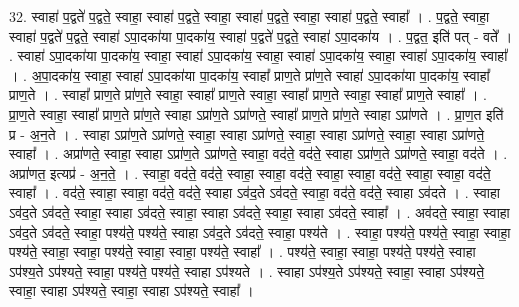 \documentclass[17pt]{extarticle}
\begin{document}
32. स्वाहा॑ प॒द्वते॑ प॒द्वते॒ स्वाहा॒ स्वाहा॑ प॒द्वते॒ स्वाहा॒ स्वाहा॑ प॒द्वते॒ स्वाहा॒ स्वाहा॑ प॒द्वते॒ स्वाहा᳚ । . प॒द्वते॒ स्वाहा॒ स्वाहा॑ प॒द्वते॑ प॒द्वते॒ स्वाहा॑ ऽपा॒दका॑या पा॒दका॑य॒ स्वाहा॑ प॒द्वते॑ प॒द्वते॒ स्वाहा॑ ऽपा॒दका॑य । . प॒द्वत॒ इति॑ पत् - वते᳚ । . स्वाहा॑ ऽपा॒दका॑या पा॒दका॑य॒ स्वाहा॒ स्वाहा॑ ऽपा॒दका॑य॒ स्वाहा॒ स्वाहा॑ ऽपा॒दका॑य॒ स्वाहा॒ स्वाहा॑ ऽपा॒दका॑य॒ स्वाहा᳚ । . अ॒पा॒दका॑य॒ स्वाहा॒ स्वाहा॑ ऽपा॒दका॑या पा॒दका॑य॒ स्वाहा᳚ प्राण॒ते प्रा॑ण॒ते स्वाहा॑ ऽपा॒दका॑या पा॒दका॑य॒ स्वाहा᳚ प्राण॒ते । . स्वाहा᳚ प्राण॒ते प्रा॑ण॒ते स्वाहा॒ स्वाहा᳚ प्राण॒ते स्वाहा॒ स्वाहा᳚ प्राण॒ते स्वाहा॒ स्वाहा᳚ प्राण॒ते स्वाहा᳚ । . प्रा॒ण॒ते स्वाहा॒ स्वाहा᳚ प्राण॒ते प्रा॑ण॒ते स्वाहा ऽप्रा॑ण॒ते ऽप्रा॑णते॒ स्वाहा᳚ प्राण॒ते प्रा॑ण॒ते स्वाहा ऽप्रा॑णते । . प्रा॒ण॒त इति॑ प्र - अ॒न॒ते । . स्वाहा ऽप्रा॑ण॒ते ऽप्रा॑णते॒ स्वाहा॒ स्वाहा ऽप्रा॑णते॒ स्वाहा॒ स्वाहा ऽप्रा॑णते॒ स्वाहा॒ स्वाहा ऽप्रा॑णते॒ स्वाहा᳚ । . अप्रा॑णते॒ स्वाहा॒ स्वाहा ऽप्रा॑ण॒ते ऽप्रा॑णते॒ स्वाहा॒ वद॑ते॒ वद॑ते॒ स्वाहा ऽप्रा॑ण॒ते ऽप्रा॑णते॒ स्वाहा॒ वद॑ते । . अप्रा॑णत॒ इत्यप्र॑ - अ॒न॒ते॒ । . स्वाहा॒ वद॑ते॒ वद॑ते॒ स्वाहा॒ स्वाहा॒ वद॑ते॒ स्वाहा॒ स्वाहा॒ वद॑ते॒ स्वाहा॒ स्वाहा॒ वद॑ते॒ स्वाहा᳚ । . वद॑ते॒ स्वाहा॒ स्वाहा॒ वद॑ते॒ वद॑ते॒ स्वाहा ऽव॑द॒ते ऽव॑दते॒ स्वाहा॒ वद॑ते॒ वद॑ते॒ स्वाहा ऽव॑दते । . स्वाहा ऽव॑द॒ते ऽव॑दते॒ स्वाहा॒ स्वाहा ऽव॑दते॒ स्वाहा॒ स्वाहा ऽव॑दते॒ स्वाहा॒ स्वाहा ऽव॑दते॒ स्वाहा᳚ । . अव॑दते॒ स्वाहा॒ स्वाहा ऽव॑द॒ते ऽव॑दते॒ स्वाहा॒ पश्य॑ते॒ पश्य॑ते॒ स्वाहा ऽव॑द॒ते ऽव॑दते॒ स्वाहा॒ पश्य॑ते । . स्वाहा॒ पश्य॑ते॒ पश्य॑ते॒ स्वाहा॒ स्वाहा॒ पश्य॑ते॒ स्वाहा॒ स्वाहा॒ पश्य॑ते॒ स्वाहा॒ स्वाहा॒ पश्य॑ते॒ स्वाहा᳚ । . पश्य॑ते॒ स्वाहा॒ स्वाहा॒ पश्य॑ते॒ पश्य॑ते॒ स्वाहा ऽप॑श्य॒ते ऽप॑श्यते॒ स्वाहा॒ पश्य॑ते॒ पश्य॑ते॒ स्वाहा ऽप॑श्यते । . स्वाहा ऽप॑श्य॒ते ऽप॑श्यते॒ स्वाहा॒ स्वाहा ऽप॑श्यते॒ स्वाहा॒ स्वाहा ऽप॑श्यते॒ स्वाहा॒ स्वाहा ऽप॑श्यते॒ स्वाहा᳚ । \newline
\end{document}
